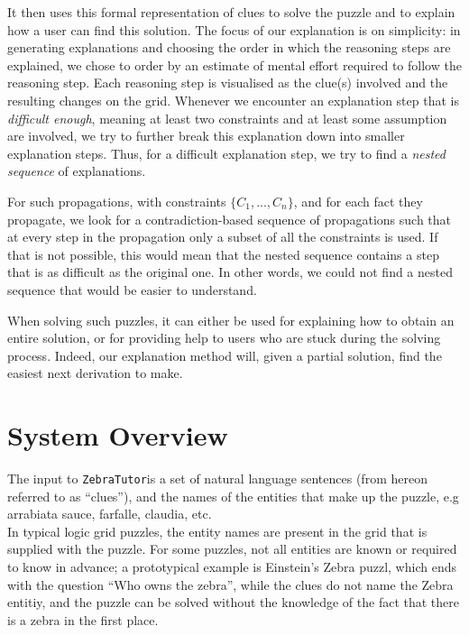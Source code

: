 \documentclass{article}
\newcommand{\ourtool}{\texttt{ZebraTutor}}
\begin{document}
It then uses this formal representation of clues to solve the puzzle and to explain how a user can find this solution. The focus of our explanation is on simplicity: in generating explanations and choosing the order in which the reasoning steps are explained, we chose to order by an estimate of mental effort required to follow the reasoning step. Each reasoning step is visualised as the clue(s) involved and the resulting changes on the grid.
Whenever we encounter an explanation step that is \textit{difficult enough}, meaning at least two constraints and at least some assumption are involved, we try to further break this explanation down into smaller explanation steps. Thus, for a difficult explanation step, we try to find a \textit{nested sequence} of explanations. 

For such propagations, with constraints $\{ C_1, ...,C_n\}$, and for each fact they propagate, we look for a contradiction-based sequence of propagations such that at every step in the propagation only a subset of all the constraints is used. If that is not possible, this would mean that the nested sequence contains a step that is as difficult as the original one. In other words, we could not find a nested sequence that would be easier to understand.

When solving such puzzles, it can either be used for explaining how to obtain an entire solution, or for providing help to users who are stuck during the solving process. Indeed, our explanation method will, given a partial solution, find the easiest next derivation to make.




\section{System Overview}
The input to \ourtool is a set of natural language sentences (from hereon referred to as ``clues''), and the names of the entities that make up the puzzle, e.g arrabiata sauce, farfalle, claudia, etc. \\
In typical logic grid puzzles, the entity names are present in the grid that is supplied with the puzzle. For some puzzles, not all entities are known or required to know in advance; a prototypical example is Einstein's Zebra puzzl, which ends with the question ``Who owns the zebra'', while the clues do not name the Zebra entitiy, and the puzzle can be solved without the knowledge of the fact that there is a zebra in the first place.
\end{document}
